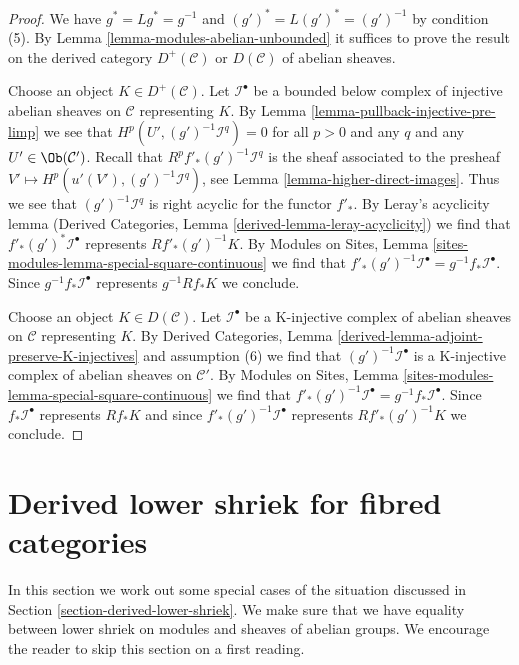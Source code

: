 \begin{proof}
We have $g^* = Lg^* = g^{-1}$ and $(g')^* = L(g')^* = (g')^{-1}$
by condition (5).
By Lemma \ref{lemma-modules-abelian-unbounded} it suffices
to prove the result on the derived category $D^+(\mathcal{C})$ or
$D(\mathcal{C})$ of abelian sheaves.

\medskip\noindent
Choose an object $K \in D^+(\mathcal{C})$.
Let $\mathcal{I}^\bullet$ be a bounded below complex of injective abelian
sheaves on $\mathcal{C}$ representing $K$. By
Lemma \ref{lemma-pullback-injective-pre-limp}
we see that $H^p(U', (g')^{-1}\mathcal{I}^q) = 0$ for
all $p > 0$ and any $q$ and any $U' \in \Ob(\mathcal{C}')$.
Recall that $R^pf'_*(g')^{-1}\mathcal{I}^q$ is the sheaf
associated to the presheaf $V' \mapsto H^p(u'(V'), (g')^{-1}\mathcal{I}^q)$,
see Lemma \ref{lemma-higher-direct-images}.
Thus we see that $(g')^{-1}\mathcal{I}^q$ is right acyclic
for the functor $f'_*$. By Leray's acyclicity lemma
(Derived Categories, Lemma \ref{derived-lemma-leray-acyclicity})
we find that $f'_*(g')^*\mathcal{I}^\bullet$
represents $Rf'_*(g')^{-1}K$.
By Modules on Sites, Lemma
\ref{sites-modules-lemma-special-square-continuous}
we find that $f'_*(g')^{-1}\mathcal{I}^\bullet = g^{-1}f_*\mathcal{I}^\bullet$.
Since $g^{-1}f_*\mathcal{I}^\bullet$ represents $g^{-1}Rf_*K$
we conclude.

\medskip\noindent
Choose an object $K \in D(\mathcal{C})$.
Let $\mathcal{I}^\bullet$ be a K-injective complex of abelian
sheaves on $\mathcal{C}$ representing $K$. By
Derived Categories, Lemma \ref{derived-lemma-adjoint-preserve-K-injectives}
and assumption (6) we find that $(g')^{-1}\mathcal{I}^\bullet$
is a K-injective complex of abelian sheaves on $\mathcal{C}'$.
By Modules on Sites, Lemma
\ref{sites-modules-lemma-special-square-continuous}
we find that $f'_*(g')^{-1}\mathcal{I}^\bullet = g^{-1}f_*\mathcal{I}^\bullet$.
Since $f_*\mathcal{I}^\bullet$ represents $Rf_*K$ and since
$f'_*(g')^{-1}\mathcal{I}^\bullet$ represents $Rf'_*(g')^{-1}K$
we conclude.
\end{proof}








\section{Derived lower shriek for fibred categories}
\label{section-derived-lower-shriek-fibred}

\noindent
In this section we work out some special cases of the situation
discussed in Section \ref{section-derived-lower-shriek}.
We make sure that we have equality between lower shriek on modules
and sheaves of abelian groups. We encourage the reader to skip
this section on a first reading.

